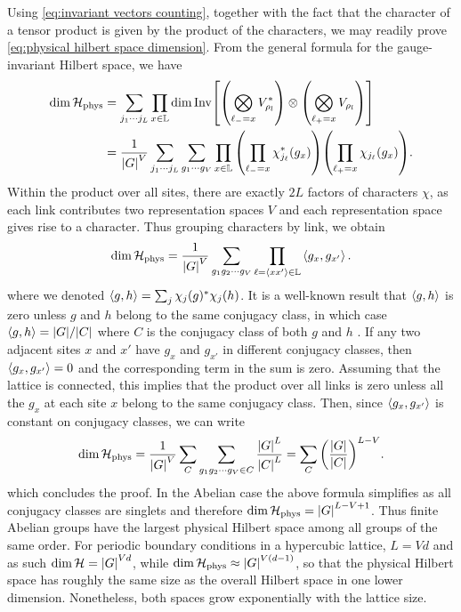 Using \eqref{eq:invariant vectors counting}, together with the fact that the character of a tensor product is given by the product of the characters, we may readily prove \eqref{eq:physical hilbert space dimension}. From the general formula for the gauge-invariant Hilbert space, we have
\begin{equation*}
    \begin{split}
        \dim{\HilbertPhys}
        & = \sum_{j_1 \cdots j_L} \prod_{x \in \Lattice}
            \dim \mathrm{Inv}\bqty{
                \pqty{\bigotimes_{\link_{-} = x}  V_{\rho_l}^*} \otimes
                \pqty{\bigotimes_{\link_{+} = x}  V_{\rho_l}}
            } \\
        & = \frac{1}{\abs{G}^V} \sum_{j_1 \cdots j_L} \sum_{g_1 \cdots g_V} \prod_{x \in \Lattice}
            \pqty{\prod_{\link_{-} = x}  \chi_{j_{\link}}^*(g_x)}
            \pqty{\prod_{\link_{+} = x} \chi_{j_{\link}}(g_x)}.
    \end{split}
\end{equation*}
Within the product over all sites, there are exactly $2L$ factors of characters $\chi$, as each link contributes two representation spaces $V$ and each representation space gives rise to a character. Thus grouping characters by link, we obtain
\begin{equation}
    \dim{\mathcal{H}_{\text{phys}}} =\frac{1}{\abs{G}^V} \sum_{g_1 g_2 \cdots g_V} \prod_{\ell = \expval{xx'} \in \mathbb{L}} \expval{g_x, g_{x'}}.
\end{equation}
where we denoted $\expval{g, h} = \sum_j \chi_j(g)^* \chi_j(h)$. It is a well-known result that $\expval{g, h}$ is zero unless $g$ and $h$ belong to the same conjugacy class, in which case $\expval{g, h} = \abs{G} / \abs{C}$ where $C$ is the conjugacy class of both $g$ and $h$ \cite{serre1967representations}. If any two adjacent sites $x$ and $x'$ have $g_x$ and $g_{x'}$ in different conjugacy classes, then $\expval{g_x, g_{x'}}=0$ and the corresponding term in the sum is zero. Assuming that the lattice is connected, this implies that the product over all links is zero unless all the $g_x$ at each site $x$ belong to the same conjugacy class. Then, since $\expval{g_x, g_{x'}}$ is constant on conjugacy classes, we can write
\begin{equation}
    \dim{\HilbertPhys}
    =\frac{1}{\abs{G}^V} \sum_C \sum_{g_1 g_2 \cdots g_V \in C} \frac{\abs{G}^L}{\abs{C}^L} = \sum_C  \pqty{\frac{\abs{G}}{\abs{C}}}^{L-V}.
\end{equation}
which concludes the proof.
In the Abelian case the above formula simplifies as all conjugacy classes are singlets and therefore $\dim{\mathcal{H}_{\text{phys}}} = \abs{G}^{L-V+1}$.
Thus finite Abelian groups have the largest physical Hilbert space among all groups of the same order.
For periodic boundary conditions in a hypercubic lattice, $L=Vd$ and as such $\dim{\mathcal{H}}=\abs{G}^{Vd}$, while $\dim{\mathcal{H}_{\text{phys}}} \approx \abs{G}^{V (d-1)}$, so that the physical Hilbert space has roughly the same size as the overall Hilbert space in one lower dimension.
Nonetheless, both spaces grow exponentially with the lattice size.

